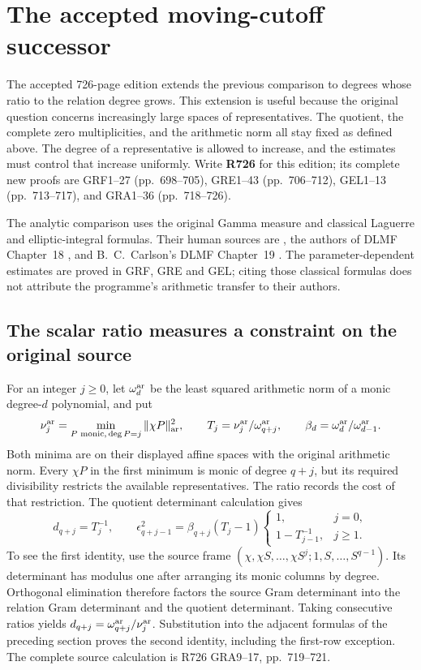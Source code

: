 \section{The accepted moving-cutoff successor}
\label{sec:moving-cutoff}

The accepted 726-page edition extends the previous comparison to degrees
whose ratio to the relation degree grows. This extension is useful because
the original question concerns increasingly large spaces of representatives.
The quotient, the complete zero multiplicities, and the arithmetic norm all
stay fixed as defined above. The degree of a representative is allowed to
increase, and the estimates must control that increase uniformly.
Write \textbf{R726} for this edition; its complete new proofs are
GRF1--27 (pp.~698--705), GRE1--43 (pp.~706--712), GEL1--13
(pp.~713--717), and GRA1--36 (pp.~718--726).

The analytic comparison uses the original Gamma measure and classical
Laguerre and elliptic-integral formulas. Their human sources are
\citet{Szego1975}, the authors of DLMF Chapter~18
\citep{DLMF18Current}, and B.~C.~Carlson's DLMF Chapter~19
\citep{DLMF19Current}. The parameter-dependent estimates are proved in
GRF, GRE and GEL; citing those classical formulas does not attribute
the programme's arithmetic transfer to their authors.

\subsection{The scalar ratio measures a constraint on the original source}
For an integer \(j\ge0\), let \(\omega_d^{\rm ar}\) be the least
squared arithmetic norm of a monic degree-\(d\) polynomial, and put
\[
 \nu_j^{\rm ar}=
 \min_{P\text{ monic},\,\deg P=j}\|\chi P\|_{\rm ar}^2,
 \qquad T_j=\nu_j^{\rm ar}/\omega_{q+j}^{\rm ar},
 \qquad \beta_d=\omega_d^{\rm ar}/\omega_{d-1}^{\rm ar}.
\]
Both minima are on their displayed affine spaces with the original
arithmetic norm. Every \(\chi P\) in the first minimum is monic of
degree \(q+j\), but its required divisibility restricts the available
representatives. The ratio records the cost of that restriction.
The quotient determinant calculation gives
\[
 d_{q+j}=T_j^{-1},\qquad
 \epsilon_{q+j-1}^2=\beta_{q+j}(T_j-1)
 \begin{cases}1,&j=0,\\1-T_{j-1}^{-1},&j\ge1.
 \end{cases}
\tag{O}
\]
To see the first identity, use the source frame
\((\chi,\chi S,\ldots,\chi S^j;1,S,\ldots,S^{q-1})\).
Its determinant has modulus one after arranging its monic columns by
degree. Orthogonal elimination therefore factors the source Gram
determinant into the relation Gram determinant and the quotient
determinant. Taking consecutive ratios yields
\(d_{q+j}=\omega_{q+j}^{\rm ar}/\nu_j^{\rm ar}\).
Substitution into the adjacent formulas of the preceding section proves
the second identity, including the first-row exception. The complete
source calculation is R726 GRA9--17, pp.~719--721.

